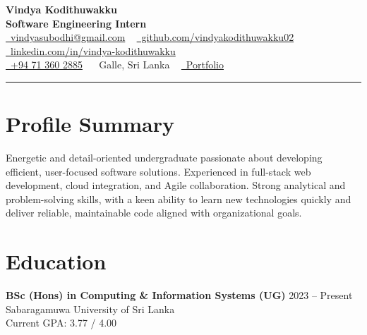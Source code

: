 \documentclass[letterpaper,11.8pt]{article}
\begin{document}
\justifying
\fontsize{11.2}{13}\selectfont

\begin{center}
{\Huge\color{accentTitle}\textbf{Vindya Kodithuwakku}}\\[3pt]
{\large\textbf{Software Engineering Intern}}\\[4pt]
\href{mailto:vindyasubodhi@gmail.com}{\faEnvelope~vindyasubodhi@gmail.com} ~
\href{https://github.com/vindyakodithuwakku02}{\faGithub~github.com/vindyakodithuwakku02} ~
\href{https://www.linkedin.com/in/vindya-kodithuwakku-bb6187202}{\faLinkedin~linkedin.com/in/vindya-kodithuwakku}\\[2pt]
\href{tel:+94713602885}{\faPhone~+94 71 360 2885} ~
\faMapMarker*~Galle, Sri Lanka ~
\href{https://vindyakodithuwakku02.github.io/my_portfolio/}{\faGlobe~Portfolio}\\[4pt]
{\color{accentLine}\hrule}
\end{center}

\fontsize{12}{13}\selectfont

\vspace{-20pt}
\section{Profile Summary}
\vspace{-2pt}
\justifying
Energetic and detail-oriented undergraduate passionate about developing efficient, user-focused software solutions. Experienced in full-stack web development, cloud integration, and Agile collaboration. Strong analytical and problem-solving skills, with a keen ability to learn new technologies quickly and deliver reliable, maintainable code aligned with organizational goals.

\section{Education}
\vspace{-1pt}
\justifying  %

\textbf{BSc (Hons) in Computing \& Information Systems (UG)} \hfill 2023 – Present\\
Sabaragamuwa University of Sri Lanka\\
Current GPA: 3.77 / 4.00
\end{document}
